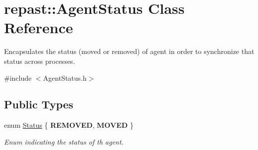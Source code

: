 \hypertarget{classrepast_1_1_agent_status}{\section{repast\-:\-:Agent\-Status Class Reference}
\label{classrepast_1_1_agent_status}
}


Encapsulates the status (moved or removed) of agent in order to synchronize that status across processes.  




{\ttfamily \#include $<$Agent\-Status.\-h$>$}

\subsection*{Public Types}
\begin{DoxyCompactItemize}
\item 
enum \hyperlink{classrepast_1_1_agent_status_ab0ec44d1ec040df129f324d0014a743c}{Status} \{ {\bfseries R\-E\-M\-O\-V\-E\-D}, 
{\bfseries M\-O\-V\-E\-D}
 \}
\begin{DoxyCompactList}\small\item\em Enum indicating the status of th agent. \end{DoxyCompactList}\end{DoxyCompactItemize}
